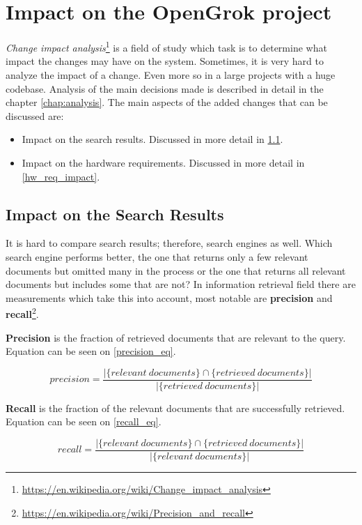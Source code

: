 \chapter{Impact on the OpenGrok project}
\label{chap:impact}

\textit{Change impact analysis}\footnote{\url{https://en.wikipedia.org/wiki/Change\_impact\_analysis}} is a field of
study which task is to determine what impact the changes may have on the system. Sometimes, it is very hard to analyze
the impact of a change. Even more so in a large projects with a huge codebase. Analysis of the main decisions made is
described in detail in the chapter \ref{chap:analysis}. The main aspects of the added changes that can be discussed are:
\begin{itemize}
    \item Impact on the search results. Discussed in more detail in \ref{search_res_impact}.
    \item Impact on the hardware requirements. Discussed in more detail in \ref{hw_req_impact}.
\end{itemize}

\section{Impact on the Search Results}
\label{search_res_impact}
It is hard to compare search results; therefore, search engines as well. Which search engine performs better, the one
that returns only a few relevant documents but omitted many in the process or the one that returns all relevant
documents but includes some that are not?
In information retrieval field there are measurements which take this into account, most notable are \textbf{precision}
and \textbf{recall}\footnote{\url{https://en.wikipedia.org/wiki/Precision\_and\_recall}}.

\textbf{Precision} is the fraction of retrieved documents that are relevant to the query. Equation can be seen on
\ref{precision_eq}.

\begin{equation}
\label{precision_eq}
precision = \frac{\vert \{relevant\ documents\} \cap \{ retrieved\ documents \} \vert}{\vert \{ retrieved\ documents \} \vert}
\end{equation}

\textbf{Recall} is the fraction of the relevant documents that are successfully retrieved. Equation can be seen on
\ref{recall_eq}.

\begin{equation}
\label{recall_eq}
recall = \frac{\vert \{relevant\ documents\} \cap \{ retrieved\ documents \} \vert}{\vert \{ relevant\ documents \} \vert}
\end{equation}

